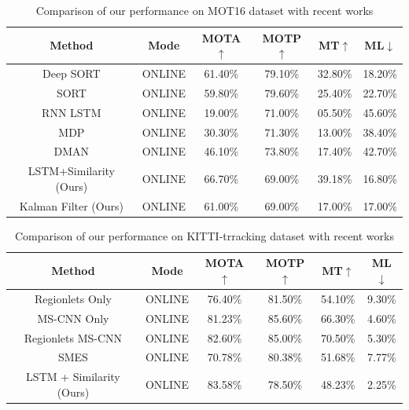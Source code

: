 \begin{table}[ht]
	\caption[Results on MOT Dataset]{Comparison  of  our  performance  on  MOT16  dataset  with  recent  works}
	\label{MOT16 Results}
	\begin{center}
		\begin{tabular}{|c||c||c||c||c||c|}
			\hline
			Method & Mode & MOTA$\uparrow$ & MOTP$\uparrow$ & MT$\uparrow$ & ML$\downarrow$\\
			\hline
			Deep SORT \cite{DeepSiam:deepSort} & ONLINE & 61.40\% & 79.10\% & 32.80\% & 18.20\%\\
			\hline
			SORT \cite{DeepSiam:Sort} & ONLINE & 59.80\% & 79.60\% & 25.40\% & 22.70\%\\
			\hline
			RNN LSTM \cite{DeepSiam:multitarget} & ONLINE & 19.00\% & 71.00\% & 05.50\% & 45.60\%\\
			\hline
			MDP \cite{DeepSiam:learntotrack} & ONLINE & 30.30\% & 71.30\% & 13.00\% & 38.40\%\\
			\hline
			DMAN \cite{DeepSiam:attention} & ONLINE & 46.10\% & 73.80\% & 17.40\% & 42.70\%\\
			\hline
			LSTM+Similarity (Ours) & ONLINE & 66.70\% & 69.00\% & 39.18\% & 16.80\%\\
			\hline
			Kalman Filter (Ours) & ONLINE & 61.00\% & 69.00\% & 17.00\% & 17.00\%\\
			\hline
		\end{tabular}
	\end{center}
\end{table}

\begin{table}[h]
	\caption[Results on KITTI dataset]{Comparison  of  our  performance  on  KITTI-trracking  dataset  with  recent  works}
	\label{KITTI Results}
	\begin{center}
		\begin{tabular}{|c||c||c||c||c||c|}
			\hline
			Method & Mode & MOTA$\uparrow$ & MOTP$\uparrow$ & MT$\uparrow$ & ML$\downarrow$\\
			\hline
			Regionlets Only \cite{DeepSiam:kalman} & ONLINE & 76.40\% & 81.50\% & 54.10\% & 9.30\%\\
			\hline
			MS-CNN Only \cite{DeepSiam:kalman} & ONLINE & 81.23\% & 85.60\% & 66.30\% & 4.60\%\\
			\hline
			Regionlets MS-CNN \cite{DeepSiam:kalman} & ONLINE & 82.60\% & 85.00\% & 70.50\% & 5.30\%\\
			\hline
			SMES \cite{DeepSiam:simmap} & ONLINE & 70.78\% & 80.38\% & 51.68\% & 7.77\%\\
			\hline
			LSTM + Similarity (Ours) & ONLINE & 83.58\% & 78.50\% & 48.23\% & 2.25\%\\
			\hline
		\end{tabular}
	\end{center}
\end{table}


